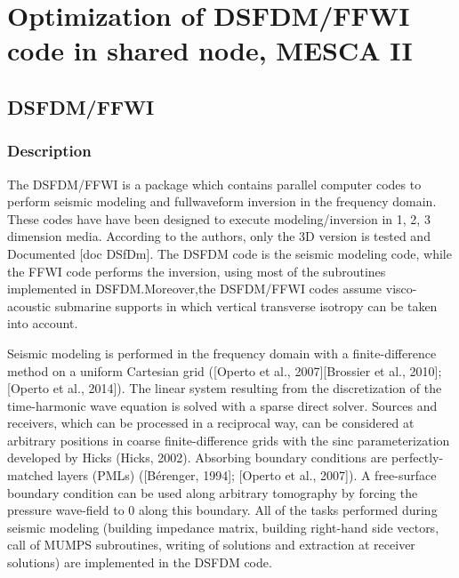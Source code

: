 \chapter{Optimization of DSFDM/FFWI code in shared node, MESCA II}
\section{DSFDM/FFWI}
\subsection{Description}
The DSFDM/FFWI is a package which contains parallel computer codes to perform seismic modeling and fullwaveform inversion in the frequency domain. These codes have have been designed to execute modeling/inversion in 1, 2, 3 dimension media. According to the authors, only the 3D version is tested and Documented [doc DSfDm]. The DSFDM code is the seismic modeling code, while the FFWI code performs the inversion, using most of the subroutines implemented in DSFDM.Moreover,the DSFDM/FFWI codes assume visco-acoustic submarine supports in which vertical transverse isotropy can be taken into account.

Seismic modeling is performed in the frequency domain with a finite-difference method on a uniform Cartesian grid ([Operto et al., 2007][Brossier et al., 2010]; [Operto et al., 2014]). The linear system resulting from
the discretization of the time-harmonic wave equation is solved with a sparse direct solver. Sources and receivers, which can be processed in a reciprocal way, can be considered at arbitrary positions in coarse finite-difference grids with the sinc parameterization developed by Hicks (Hicks, 2002). Absorbing boundary conditions are perfectly-matched layers (PMLs) ([B\'{e}renger, 1994]; [Operto et al., 2007]). A free-surface boundary condition can be used along arbitrary tomography by forcing the pressure wave-field to 0 along this boundary. All of the tasks performed during seismic modeling (building impedance matrix, building right-hand side vectors, call of MUMPS subroutines, writing of solutions and extraction at receiver solutions) are implemented in the DSFDM code.

